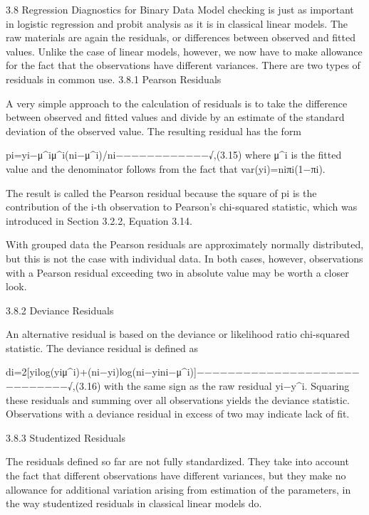
3.8 Regression Diagnostics for Binary Data
Model checking is just as important in logistic regression and probit analysis as it is in classical linear models. The raw materials are again the residuals, or differences between observed and fitted values. Unlike the case of linear models, however, we now have to make allowance for the fact that the observations have different variances. There are two types of residuals in common use.
3.8.1 Pearson Residuals

A very simple approach to the calculation of residuals is to take the difference between observed and fitted values and divide by an estimate of the standard deviation of the observed value. The resulting residual has the form

pi=yi−μ^iμ^i(ni−μ^i)/ni−−−−−−−−−−−−√,(3.15)
where μ^i is the fitted value and the denominator follows from the fact that var(yi)=niπi(1−πi).

The result is called the Pearson residual because the square of pi is the contribution of the i-th observation to Pearson’s chi-squared statistic, which was introduced in Section 3.2.2, Equation 3.14.

With grouped data the Pearson residuals are approximately normally distributed, but this is not the case with individual data. In both cases, however, observations with a Pearson residual exceeding two in absolute value may be worth a closer look.

3.8.2 Deviance Residuals

An alternative residual is based on the deviance or likelihood ratio chi-squared statistic. The deviance residual is defined as

di=2[yilog(yiμ^i)+(ni−yi)log(ni−yini−μ^i)]−−−−−−−−−−−−−−−−−−−−−−−−−−−−−√,(3.16)
with the same sign as the raw residual yi−y^i. Squaring these residuals and summing over all observations yields the deviance statistic. Observations with a deviance residual in excess of two may indicate lack of fit.

3.8.3 Studentized Residuals

The residuals defined so far are not fully standardized. They take into account the fact that different observations have different variances, but they make no allowance for additional variation arising from estimation of the parameters, in the way studentized residuals in classical linear models do.

